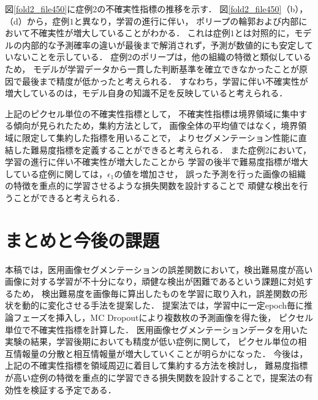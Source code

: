 \documentclass[10pt, a4paper, twocolumn]{jarticle}
\begin{document}
図\ref{fold2_file450}に症例2の不確実性指標の推移を示す．
図\ref{fold2_file450}（b），（d）から，症例$1$と異なり，学習の進行に伴い，
ポリープの輪郭および内部において不確実性が増大していることがわかる．
これは症例$1$とは対照的に，モデルの内部的な予測確率の違いが最後まで解消されず，予測が数値的にも安定していないことを示している．
症例$2$のポリープは，他の組織の特徴と類似しているため，
モデルが学習データから一貫した判断基準を確立できなかったことが原因で最後まで精度が低かったと考えられる．
すなわち，学習に伴い不確実性が増大しているのは，モデル自身の知識不足を反映していると考えられる．

上記のピクセル単位の不確実性指標として，
不確実性指標は境界領域に集中する傾向が見られたため，集約方法として，
画像全体の平均値ではなく，境界領域に限定して集約した指標を用いることで，
よりセグメンテーション性能に直結した難易度指標を定義することができると考えられる．
また症例2において，学習の進行に伴い不確実性が増大したことから
学習の後半で難易度指標が増大している症例に関しては，$\epsilon_1$の値を増加させ，
誤った予測を行った画像の組織の特徴を重点的に学習させるような損失関数を設計することで
頑健な検出を行うことができると考えられる．


\section{まとめと今後の課題}
本稿では，医用画像セグメンテーションの誤差関数において，検出難易度が高い画像に対する学習が不十分になり，頑健な検出が困難であるという課題に対処するため，
検出難易度を画像毎に算出したものを学習に取り入れ，誤差関数の形状を動的に変化させる手法を提案した．
提案法では，学習中に一定epoch毎に推論フェーズを挿入し，MC Dropoutにより複数枚の予測画像を得た後，
ピクセル単位で不確実性指標を計算した．
医用画像セグメンテーションデータを用いた実験の結果，学習後期においても精度が低い症例に関して，
ピクセル単位の相互情報量の分散と相互情報量が増大していくことが明らかになった．
今後は，上記の不確実性指標を領域周辺に着目して集約する方法を検討し，
難易度指標が高い症例の特徴を重点的に学習できる損失関数を設計することで，提案法の有効性を検証する予定である．

\newpage
\end{document}
